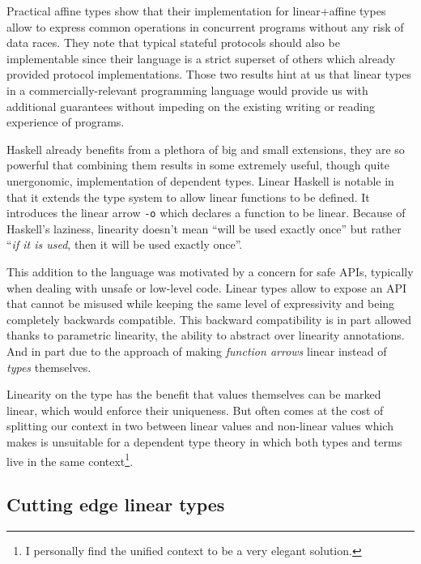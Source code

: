 \documentclass[
]{article}
\begin{document}
Practical affine types show that their implementation for linear+affine
types allow to express common operations in concurrent programs without
any risk of data races\cite{linear_race}. They note that typical
stateful protocols should also be implementable since their language is
a strict superset of others which already provided protocol
implementations. Those two results hint at us that linear types in a
commercially-relevant programming language would provide us with
additional guarantees without impeding on the existing writing or
reading experience of programs.

Haskell already benefits from a plethora of big and small extensions,
they are so powerful that combining them results in some extremely
useful, though quite unergonomic, implementation of dependent
types\cite{hasochism}. Linear Haskell\cite{linear_haskell} is notable in
that it extends the type system to allow linear functions to be defined.
It introduces the linear arrow \texttt{-o} which declares a function to
be linear. Because of Haskell's laziness, linearity doesn't mean ``will
be used exactly once'' but rather ``\emph{if it is used}, then it will
be used exactly once''.

This addition to the language was motivated by a concern for safe APIs,
typically when dealing with unsafe or low-level code. Linear types allow
to expose an API that cannot be misused while keeping the same level of
expressivity and being completely backwards compatible. This backward
compatibility is in part allowed thanks to parametric linearity, the
ability to abstract over linearity annotations. And in part due to the
approach of making \emph{function arrows} linear instead of \emph{types}
themselves.

Linearity on the type has the benefit that values themselves can be
marked linear, which would enforce their uniqueness. But often comes at
the cost of splitting our context in two\cite{lightweight_linear_types}
between linear values and non-linear values which makes is unsuitable
for a dependent type theory in which both types and terms live in the
same context\footnote{I personally find the unified context to be a very
  elegant solution.}.

\hypertarget{cutting-edge-linear-types}{%
\subsection{Cutting edge linear types}\label{cutting-edge-linear-types}}
\end{document}
